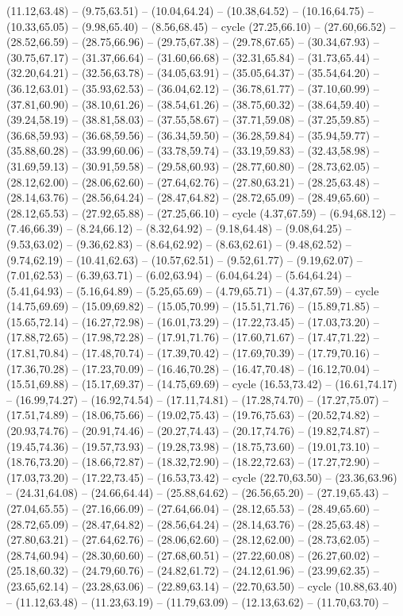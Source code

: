 {(11.12,63.48) -- (9.75,63.51) -- (10.04,64.24) -- (10.38,64.52) -- (10.16,64.75) -- (10.33,65.05) -- (9.98,65.40) -- (8.56,68.45) -- cycle (27.25,66.10) -- (27.60,66.52) -- (28.52,66.59) -- (28.75,66.96) -- (29.75,67.38) -- (29.78,67.65) -- (30.34,67.93) -- (30.75,67.17) -- (31.37,66.64) -- (31.60,66.68) -- (32.31,65.84) -- (31.73,65.44) -- (32.20,64.21) -- (32.56,63.78) -- (34.05,63.91) -- (35.05,64.37) -- (35.54,64.20) -- (36.12,63.01) -- (35.93,62.53) -- (36.04,62.12) -- (36.78,61.77) -- (37.10,60.99) -- (37.81,60.90) -- (38.10,61.26) -- (38.54,61.26) -- (38.75,60.32) -- (38.64,59.40) -- (39.24,58.19) -- (38.81,58.03) -- (37.55,58.67) -- (37.71,59.08) -- (37.25,59.85) -- (36.68,59.93) -- (36.68,59.56) -- (36.34,59.50) -- (36.28,59.84) -- (35.94,59.77) -- (35.88,60.28) -- (33.99,60.06) -- (33.78,59.74) -- (33.19,59.83) -- (32.43,58.98) -- (31.69,59.13) -- (30.91,59.58) -- (29.58,60.93) -- (28.77,60.80) -- (28.73,62.05) -- (28.12,62.00) -- (28.06,62.60) -- (27.64,62.76) -- (27.80,63.21) -- (28.25,63.48) -- (28.14,63.76) -- (28.56,64.24) -- (28.47,64.82) -- (28.72,65.09) -- (28.49,65.60) -- (28.12,65.53) -- (27.92,65.88) -- (27.25,66.10) -- cycle (4.37,67.59) -- (6.94,68.12) -- (7.46,66.39) -- (8.24,66.12) -- (8.32,64.92) -- (9.18,64.48) -- (9.08,64.25) -- (9.53,63.02) -- (9.36,62.83) -- (8.64,62.92) -- (8.63,62.61) -- (9.48,62.52) -- (9.74,62.19) -- (10.41,62.63) -- (10.57,62.51) -- (9.52,61.77) -- (9.19,62.07) -- (7.01,62.53) -- (6.39,63.71) -- (6.02,63.94) -- (6.04,64.24) -- (5.64,64.24) -- (5.41,64.93) -- (5.16,64.89) -- (5.25,65.69) -- (4.79,65.71) -- (4.37,67.59) -- cycle (14.75,69.69) -- (15.09,69.82) -- (15.05,70.99) -- (15.51,71.76) -- (15.89,71.85) -- (15.65,72.14) -- (16.27,72.98) -- (16.01,73.29) -- (17.22,73.45) -- (17.03,73.20) -- (17.88,72.65) -- (17.98,72.28) -- (17.91,71.76) -- (17.60,71.67) -- (17.47,71.22) -- (17.81,70.84) -- (17.48,70.74) -- (17.39,70.42) -- (17.69,70.39) -- (17.79,70.16) -- (17.36,70.28) -- (17.23,70.09) -- (16.46,70.28) -- (16.47,70.48) -- (16.12,70.04) -- (15.51,69.88) -- (15.17,69.37) -- (14.75,69.69) -- cycle (16.53,73.42) -- (16.61,74.17) -- (16.99,74.27) -- (16.92,74.54) -- (17.11,74.81) -- (17.28,74.70) -- (17.27,75.07) -- (17.51,74.89) -- (18.06,75.66) -- (19.02,75.43) -- (19.76,75.63) -- (20.52,74.82) -- (20.93,74.76) -- (20.91,74.46) -- (20.27,74.43) -- (20.17,74.76) -- (19.82,74.87) -- (19.45,74.36) -- (19.57,73.93) -- (19.28,73.98) -- (18.75,73.60) -- (19.01,73.10) -- (18.76,73.20) -- (18.66,72.87) -- (18.32,72.90) -- (18.22,72.63) -- (17.27,72.90) -- (17.03,73.20) -- (17.22,73.45) -- (16.53,73.42) -- cycle (22.70,63.50) -- (23.36,63.96) -- (24.31,64.08) -- (24.66,64.44) -- (25.88,64.62) -- (26.56,65.20) -- (27.19,65.43) -- (27.04,65.55) -- (27.16,66.09) -- (27.64,66.04) -- (28.12,65.53) -- (28.49,65.60) -- (28.72,65.09) -- (28.47,64.82) -- (28.56,64.24) -- (28.14,63.76) -- (28.25,63.48) -- (27.80,63.21) -- (27.64,62.76) -- (28.06,62.60) -- (28.12,62.00) -- (28.73,62.05) -- (28.74,60.94) -- (28.30,60.60) -- (27.68,60.51) -- (27.22,60.08) -- (26.27,60.02) -- (25.18,60.32) -- (24.79,60.76) -- (24.82,61.72) -- (24.12,61.96) -- (23.99,62.35) -- (23.65,62.14) -- (23.28,63.06) -- (22.89,63.14) -- (22.70,63.50) -- cycle (10.88,63.40) -- (11.12,63.48) -- (11.23,63.19) -- (11.79,63.09) -- (12.13,63.62) -- (11.70,63.70) -- }
